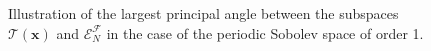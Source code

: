 \documentclass[twoside,11pt]{book}
\numberwithin{theorem}{chapter}
\numberwithin{definition}{chapter}
\numberwithin{proposition}{chapter}
\numberwithin{corollary}{chapter}
\numberwithin{example}{chapter}
\numberwithin{lemma}{chapter}
\numberwithin{assumption}{chapter}
\DeclareMathOperator{\Span}{\mathrm{Span}}
\DeclareMathOperator{\F}{\mathcal{F}}
\newcommand{\rb}[1]{\textcolor{magenta}{#1}}
\begin{document}

\begin{figure}[]
\centering

 \caption{Illustration of the largest principal angle between the subspaces $\mathcal{T}(\bm{x})$ and $\mathcal{E}_{N}^{\mathcal{F}}$ in the case of the periodic Sobolev space of order 1.  \label{fig:func_principal_angles}}
\end{figure}
\end{document}
